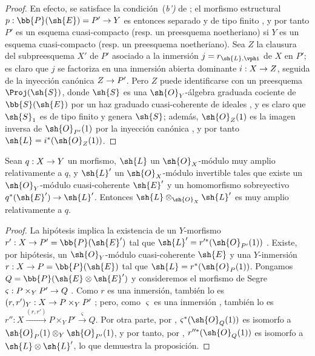 \documentclass[oneside,10pt]{amsart}
\makeatletter
\newcommand{\ega@arrow}[2]{\mathchoice{#1}{#2}{#2}{#2}}
\renewcommand{\to}{\ega@arrow{\longrightarrow}{\rightarrow}}
\newcommand{\oldpage}[2][]{\marginnote{\normalfont\footnotesize\textbf{#1}~|~#2}\ignorespaces}
\let\EGAOriginalLabel\label
\renewcommand{\label}[1]{\phantomsection\EGAOriginalLabel{#1}}
\makeatother
\begin{document}
\begin{proof}
En efecto, se satisface la condición~(\emph{b')} de ;
el morfismo estructural $p:\bb{P}(\sh{E})=P'\to Y$ es entonces separado y de tipo finito , y por tanto $P'$ es un esquema cuasi-compacto (resp. un preesquema noetheriano) si $Y$ es un esquema cuasi-compacto (resp. un preesquema noetheriano).
Sea $Z$ la clausura  del subpreesquema $X'$ de $P'$ asociado a la inmersión $j=r_{\sh{L},\vphi}$ de $X$ en $P'$;
es claro que $j$ se factoriza en una inmersión abierta dominante $i:X\to Z$, seguida de la inyección canónica $Z\to P'$.
Pero $Z$ puede identificarse con un preesquema $\Proj(\sh{S})$, donde $\sh{S}$ es una $\sh{O}_Y$-álgebra graduada cociente de $\bb{S}(\sh{E})$ por un haz graduado cuasi-coherente de ideales , y es claro que $\sh{S}_1$ es de tipo finito y genera $\sh{S}$;
además, $\sh{O}_Z(1)$ es la imagen inversa de $\sh{O}_{P'}(1)$ por la inyección canónica , y por tanto $\sh{L}=i^*(\sh{O}_Z(1))$.
\end{proof}

\begin{proposition}[4.4.8]
\label{II.4.4.8}
Sean $q:X\to Y$ un morfismo, $\sh{L}$ un $\sh{O}_X$-módulo muy amplio relativamente a $q$, y $\sh{L}'$ un $\sh{O}_X$-módulo invertible tales que existe un $\sh{O}_Y$-módulo cuasi-coherente $\sh{E}'$ y un homomorfismo sobreyectivo $q^*(\sh{E}')\to\sh{L}'$.
Entonces $\sh{L}\otimes_{\sh{O}_X}\sh{L}'$ es muy amplio relativamente a $q$.
\end{proposition}

\begin{proof}
La hipótesis implica la existencia de un $Y$-morfismo $r':X\to P'=\bb{P}(\sh{E}')$ tal que $\sh{L}'=r'^*(\sh{O}_{P'}(1))$ .
Existe, por hipótesis, un $\sh{O}_Y$-módulo cuasi-coherente $\sh{E}$ y una
\oldpage[II]{81}
$Y$-inmersión $r:X\to P=\bb{P}(\sh{E})$ tal que $\sh{L}=r^*(\sh{O}_P(1))$.
Pongamos $Q=\bb{P}(\sh{E}\otimes\sh{E}')$ y consideremos el morfismo de Segre $\varsigma:P\times_Y P'\to Q$ .
Como $r$ es una inmersión, también lo es $(r,r')_Y:X\to P\times_Y P'$ ;
pero, como $\varsigma$ es una inmersión , también lo es $r'':X\xrightarrow{(r,r')}P\times_Y P'\xrightarrow{\varsigma}Q$.
Por otra parte, por , $\varsigma^*(\sh{O}_Q(1))$ es isomorfo a $\sh{O}_P(1)\otimes_Y\sh{O}_{P'}(1)$, y por tanto, por , $r''^*(\sh{O}_Q(1))$ es isomorfo a $\sh{L}\otimes\sh{L}'$, lo que demuestra la proposición.
\end{proof}
\end{document}
